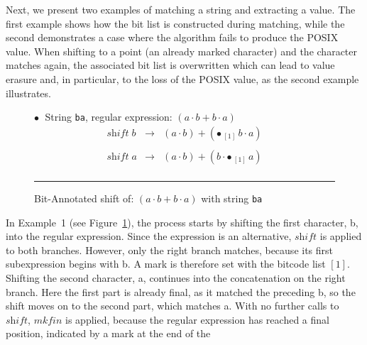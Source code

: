 \documentclass[12pt]{article}
\newcommand{\shift}{\textit{shift}}
\newcommand{\Marked}[1]{\bullet\,#1}
\newcommand{\mkfin}{\textit{mkfin}}
\begin{document}
Next, we present two examples of matching a string and extracting a value.  
The first example shows how the bit list is constructed during matching,  
while the second demonstrates a case where the algorithm fails to produce the POSIX value.
When shifting to a point (an already marked character) and the character matches again, the associated 
bit list is overwritten which can lead to value erasure and, in particular, to the loss of the POSIX value,  
as the second example illustrates.  


  \begin{figure}[ht]
    $\bullet\;$ String \texttt{ba}, regular expression: $(a \cdot b + b \cdot a)$
    \[
    \begin{array}{rcl}
      \shift\; b & \rightarrow & (a \cdot b) + (\Marked{_{[1]}\, b} \cdot a)\\\\
      \shift\; a & \rightarrow & (a \cdot b) + (b \cdot \Marked{_{[1]}\, a} )\\
    \end{array}
    \]
    \hrule

    \caption{Bit-Annotated shift of: $(a \cdot b + b \cdot a)$ with string \texttt{ba}} \label{BitAnnotatedShiftExample1}
    \mbox{}

  \end{figure}
      
In Example~1 (see Figure~\ref{BitAnnotatedShiftExample1}), the process starts by shifting the
first character, b, into the regular expression. Since the expression is an alternative, $\shift$ is
applied to both branches. However, only the right branch matches, because its first subexpression
begins with b. A mark is therefore set with the bitcode list $[1]$. Shifting the second character, a,
continues into the concatenation on the right branch. Here the first part is already final, as it
matched the preceding b, so the shift moves on to the second part, which matches a. With no further
calls to $\shift$, $\mkfin$ is applied, because the regular expression has reached a final position,
indicated by a mark at the end of the
\end{document}
